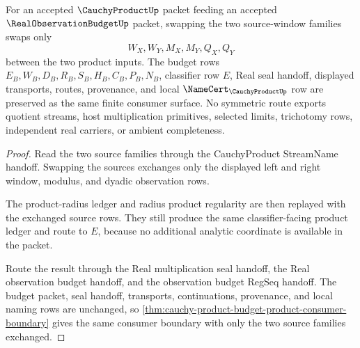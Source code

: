 \begin{theorem}
\label{thm:cauchy-product-budget-product-symmetric-route}
For an accepted $\CauchyProductUp$ packet feeding an accepted $\RealObservationBudgetUp$ packet, swapping the two source-window families swaps only
$$
W_X,W_Y,M_X,M_Y,Q_X,Q_Y
$$
between the two product inputs. The budget rows $E_B,W_B,D_B,R_B,S_B,H_B,C_B,P_B,N_B$, classifier row $E$, Real seal handoff, displayed transports, routes, provenance, and local $\NameCert_{\CauchyProductUp}$ row are preserved as the same finite consumer surface. No symmetric route exports quotient streams, host multiplication primitives, selected limits, trichotomy rows, independent real carriers, or ambient completeness.
\end{theorem}
\begin{proof}
Read the two source families through the CauchyProduct StreamName handoff. Swapping the sources exchanges only the displayed left and right window, modulus, and dyadic observation rows.

The product-radius ledger and radius product regularity are then replayed with the exchanged source rows. They still produce the same classifier-facing product ledger and route to $E$, because no additional analytic coordinate is available in the packet.

Route the result through the Real multiplication seal handoff, the Real observation budget handoff, and the observation budget RegSeq handoff. The budget packet, seal handoff, transports, continuations, provenance, and local naming rows are unchanged, so \autoref{thm:cauchy-product-budget-product-consumer-boundary} gives the same consumer boundary with only the two source families exchanged.
\end{proof}

